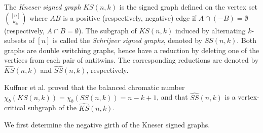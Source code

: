 \documentclass{article}
\newcommand{\KS}{\mathit{KS}} %
\newcommand{\SSG}{\mathit{SS}} %
\newcommand{\HKS}{\widehat{\KS}}
\newcommand{\HSS}{\widehat{\SSG}}
\begin{document}
The \emph{Kneser signed graph} $\KS(n,k)$ is the signed graph defined on the vertex set $\binom{[n]}{k_{\pm}}$ where $AB$ is a positive (respectively, negative) edge if $A\cap (-B)=\emptyset$ (respectively, $A\cap B=\emptyset$). The subgraph of $\KS(n,k)$ induced by alternating $k$-subsets of $[n]$ is called the \emph{Schrijver signed graphs}, denoted by $\SSG(n,k)$. Both graphs are double switching graphs, hence have a reduction by deleting one of the vertices from each pair of antitwins. The corresponding reductions are denoted by $\HKS(n,k)$ and $\HSS(n,k)$, respectively.

Kuffner et al.\cite{KNWYZZ25+} proved that the balanced chromatic number $\chi_b(\KS(n,k))=\chi_b(\SSG(n,k))=n-k+1$, and that $\HSS(n,k)$ is a vertex-critical subgraph of the $\HKS(n,k)$.

We first determine the negative girth of the Kneser signed graphs. 
\end{document}

